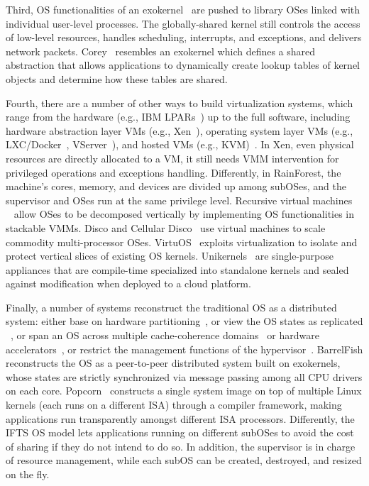 \documentclass[pageno]{jpaper}
\begin{document}
Third, OS functionalities of an exokernel~\cite{Engler:1995:EOS:224056.224076} are pushed to library OSes linked with individual user-level processes. The globally-shared kernel still controls the access of low-level resources, handles scheduling, interrupts, and exceptions, and delivers network packets.
Corey~\cite{boyd2008corey} resembles an exokernel which defines a shared abstraction that allows applications to dynamically create lookup tables of kernel objects and determine how these tables are shared.  



Fourth, there are a number of other ways to build virtualization systems, which
range from the hardware (e.g., IBM LPARs~\cite{Jann:2003:IBM_LPARs}) up to the full software, including hardware abstraction layer VMs (e.g., Xen~\cite{barham2003xen}), operating system layer VMs (e.g., LXC/Docker~\cite{banga1999resource, merkel2014docker}, VServer~\cite{soltesz2007container}), and hosted VMs (e.g., KVM)~\cite{kivity2007kvm}.
In Xen, even physical resources are directly allocated to a VM, it still needs VMM intervention for privileged operations and  exceptions handling. Differently, in RainForest, the machine's cores,
memory, and devices are divided up among subOSes, and the supervisor and OSes run at the same privilege level. Recursive virtual machines~\cite{Ford:1996:MMR:238721.238769, goldberg1974survey} ~\cite{zhang2011cloudvisor} allow OSes to be decomposed vertically by implementing OS functionalities in stackable VMMs.
Disco and Cellular Disco~\cite{govil1999cellular, bugnion1997disco}
use virtual machines to scale commodity multi-processor OSes.            VirtuOS~\cite{nikolaev2013virtuos} exploits virtualization to isolate
and protect vertical slices of existing OS kernels.
Unikernels~\cite{Madhavapeddy:2013:ULO:2451116.2451167} are single-purpose appliances that are compile-time specialized into standalone kernels and sealed against modification when deployed to a cloud platform.

Finally, a number of systems reconstruct the traditional OS as a distributed system: either base on hardware partitioning~\cite{SUN_Dynamic_system_domains}, or view the OS states as replicated
~\cite{Baumann:2009:multikernel, schupbach2008embracing, beckmann2014pika, barbalacetowards, shimosawa2008logical,kale2011distributing, nomura2011mint}, or span an OS across multiple cache-coherence domains~\cite{lin2014k2} or hardware accelerators~\cite{nightingale2009helios},
or restrict the management functions of the hypervisor~\cite{keller2010nohype, szefer2011eliminating}.
BarrelFish reconstructs the OS as a peer-to-peer distributed system built on exokernels, whose states are strictly synchronized via message passing among all CPU drivers on each core. Popcorn~\cite{Barbalace:2015:popcorn} constructs a single system image on top of multiple Linux kernels (each runs on a different ISA) through a compiler framework, making applications run transparently amongst different ISA processors. Differently, the IFTS OS model lets
applications running on different subOSes to avoid the cost of sharing if they do not intend to do so. In addition, the supervisor is in charge of resource management, while each subOS can be created, destroyed, and resized on the fly.
\end{document}
